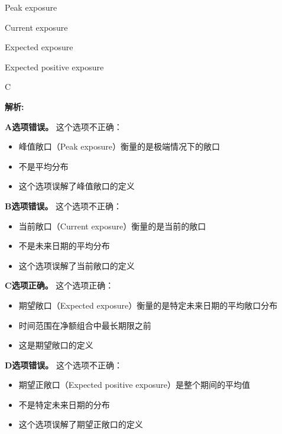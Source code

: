 \documentclass{article}
\newenvironment{explanation}
{\textbf{解析:}\par}
{\par}
\begin{document}
\begin{choices}
    \item Peak exposure
    \item Current exposure
    \item Expected exposure
    \item Expected positive exposure
\end{choices}

\begin{correctanswer}
    C
\end{correctanswer}

\begin{explanation}
    \textbf{A选项错误。}
    这个选项不正确：
    \begin{itemize}
        \item 峰值敞口（Peak exposure）衡量的是极端情况下的敞口
        \item 不是平均分布
        \item 这个选项误解了峰值敞口的定义
    \end{itemize}

    \textbf{B选项错误。}
    这个选项不正确：
    \begin{itemize}
        \item 当前敞口（Current exposure）衡量的是当前的敞口
        \item 不是未来日期的平均分布
        \item 这个选项误解了当前敞口的定义
    \end{itemize}

    \textbf{C选项正确。}
    这个选项正确：
    \begin{itemize}
        \item 期望敞口（Expected exposure）衡量的是特定未来日期的平均敞口分布
        \item 时间范围在净额组合中最长期限之前
        \item 这是期望敞口的定义
    \end{itemize}

    \textbf{D选项错误。}
    这个选项不正确：
    \begin{itemize}
        \item 期望正敞口（Expected positive exposure）是整个期间的平均值
        \item 不是特定未来日期的分布
        \item 这个选项误解了期望正敞口的定义
    \end{itemize}
\end{explanation}
\end{document}
